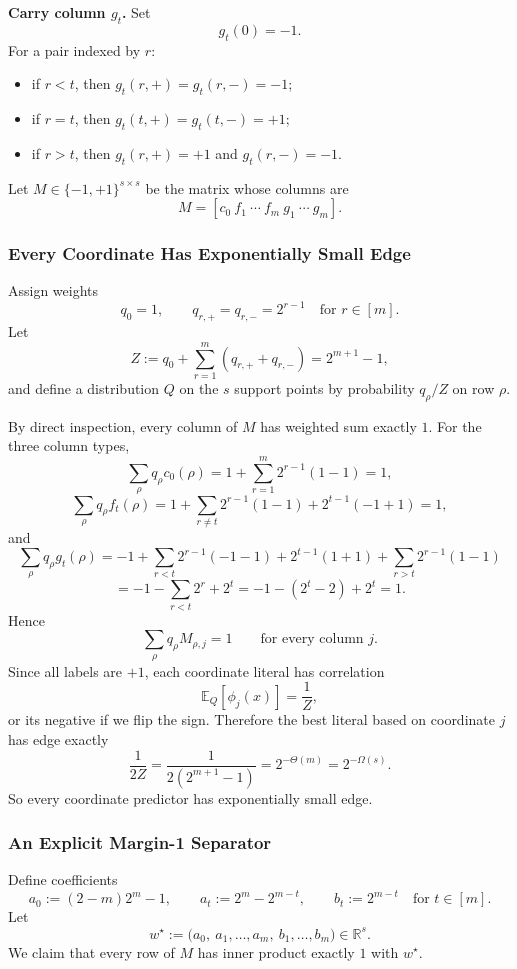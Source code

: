 \documentclass{article}
\newcommand{\EE}{\mathbb{E}}
\begin{document}
\textbf{Carry column $g_t$.}
Set
$$
g_t(0)=-1.
$$
For a pair indexed by $r$:
\begin{itemize}
\item if $r<t$, then $g_t(r,+)=g_t(r,-)=-1$;
\item if $r=t$, then $g_t(t,+)=g_t(t,-)=+1$;
\item if $r>t$, then $g_t(r,+)=+1$ and $g_t(r,-)=-1$.
\end{itemize}

Let $M\in\{-1,+1\}^{s\times s}$ be the matrix whose columns are
$$
M=[c_0\ f_1\ \cdots\ f_m\ g_1\ \cdots\ g_m].
$$

\subsubsection{Every Coordinate Has Exponentially Small Edge}

Assign weights
$$
q_0=1,
\qquad
q_{r,+}=q_{r,-}=2^{r-1}
\quad\text{for }r\in[m].
$$
Let
$$
Z := q_0+\sum_{r=1}^m (q_{r,+}+q_{r,-}) = 2^{m+1}-1,
$$
and define a distribution $Q$ on the $s$ support points by probability $q_\rho/Z$ on row $\rho$.

By direct inspection, every column of $M$ has weighted sum exactly $1$. For the three column types,
$$
\sum_{\rho} q_\rho c_0(\rho)
=
1+\sum_{r=1}^m 2^{r-1}(1-1)
=
1,
$$
$$
\sum_{\rho} q_\rho f_t(\rho)
=
1+\sum_{r\ne t} 2^{r-1}(1-1) + 2^{t-1}(-1+1)
=
1,
$$
and
$$
\sum_{\rho} q_\rho g_t(\rho)
=
-1+\sum_{r<t} 2^{r-1}(-1-1) + 2^{t-1}(1+1) + \sum_{r>t} 2^{r-1}(1-1)
$$
$$
=
-1-\sum_{r<t} 2^r + 2^t
=
-1-(2^t-2)+2^t
=
1.
$$
Hence
$$
\sum_{\rho} q_\rho M_{\rho,j} = 1
\qquad
\text{for every column }j.
$$
Since all labels are $+1$, each coordinate literal has correlation
$$
\EE_Q[\phi_j(x)] = \frac{1}{Z},
$$
or its negative if we flip the sign. Therefore the best literal based on coordinate $j$ has edge exactly
$$
\frac{1}{2Z}
=
\frac{1}{2(2^{m+1}-1)}
=
2^{-\Theta(m)}
=
2^{-\Omega(s)}.
$$
So every coordinate predictor has exponentially small edge.

\subsubsection{An Explicit Margin-1 Separator}

Define coefficients
$$
a_0 := (2-m)2^m - 1,
\qquad
a_t := 2^m - 2^{m-t},
\qquad
b_t := 2^{m-t}
\quad\text{for }t\in[m].
$$
Let
$$
w^\star :=
\bigl(
a_0,\ a_1,\dots,a_m,\ b_1,\dots,b_m
\bigr)\in\mathbb{R}^s.
$$
We claim that every row of $M$ has inner product exactly $1$ with $w^\star$.
\end{document}
